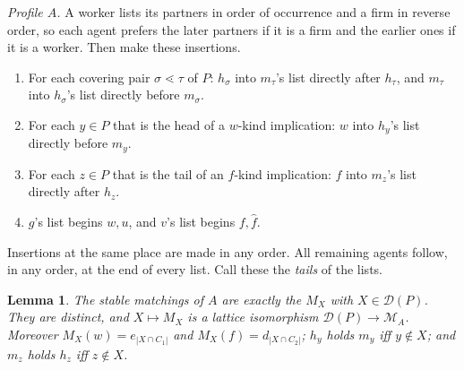 \documentclass[11pt]{article}
\newtheorem{lemma}[theorem]{Lemma}
\theoremstyle{definition}
\theoremstyle{remark}
\newcommand{\D}{\mathcal D}
\begin{document}
\emph{Profile $A$.} A worker lists its partners in order of occurrence and a firm in reverse order, so each agent prefers the later partners if it is a firm and the earlier ones if it is a worker. Then make these insertions.
\begin{enumerate}[label=(I\arabic*)]
\item For each covering pair $\sigma\lessdot\tau$ of $P$: $h_\sigma$ into $m_\tau$'s list directly after $h_\tau$, and $m_\tau$ into $h_\sigma$'s list directly before $m_\sigma$.
\item For each $y\in P$ that is the head of a $w$-kind implication: $w$ into $h_y$'s list directly before $m_y$.
\item For each $z\in P$ that is the tail of an $f$-kind implication: $f$ into $m_z$'s list directly after $h_z$.
\item $g$'s list begins $w,u$, and $v$'s list begins $f,\hat f$.
\end{enumerate}
Insertions at the same place are made in any order. All remaining agents follow, in any order, at the end of every list. Call these the \emph{tails} of the lists.

\begin{lemma}\label{lem:A}
The stable matchings of $A$ are exactly the $M_X$ with $X\in\D(P)$. They are distinct, and $X\mapsto M_X$ is a lattice isomorphism $\D(P)\to\mathcal M_A$. Moreover $M_X(w)=e_{|X\cap C_1|}$ and $M_X(f)=d_{|X\cap C_2|}$; $h_y$ holds $m_y$ iff $y\notin X$; and $m_z$ holds $h_z$ iff $z\notin X$.
\end{lemma}
\end{document}
